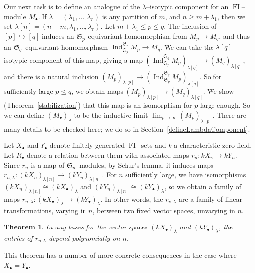 \documentclass[10pt]{amsart}
\DeclareMathOperator{\FI}{FI}
\DeclareMathOperator{\Ind}{Ind}
\newcommand{\Sn}{\mathfrak{S}}
\newcommand{\dt}{\bullet}
\newtheorem{thmab}[theorem]{Theorem}
\theoremstyle{definition}
\newcommand{\into}{\hookrightarrow}
\begin{document}
Our next task is to define an analogue of the $\lambda$--isotypic component for an $\FI$--module $M_{\dt}$. 
If $\lambda=(\lambda_1,\ldots,\lambda_r)$ is any partition of $m$, and $n \geq m + \lambda_1$, then we set $\lambda[n] = (n - m, \lambda_1,\ldots,\lambda_r)$.
Let $m+\lambda_1 \leq p \leq q$. The inclusion of $[p] \into [q]$ induces an $\Sn_{p}$--equivariant homomorphism from $M_{p} \to M_{q}$, and thus an $\Sn_{q}$--equivariant homomorphism $\Ind_{\Sn_p}^{\Sn_q} M_p \to M_q$. We can take the $\lambda[q]$ isotypic component of this map, giving a map $\left( \Ind_{\Sn_p}^{\Sn_q} M_p \right)_{\lambda[q]} \to \left( M_q \right)_{\lambda[q]}$, and there is a natural inclusion $\left( M_p \right)_{\lambda[p]} \to \left( \Ind_{\Sn_p}^{\Sn_q} M_p \right)_{\lambda[q]}$. So for sufficiently large $p \leq q$, we obtain maps $\left( M_p \right)_{\lambda[p]} \to \left( M_q \right)_{\lambda[q]}$. We show (Theorem~\ref{stabilization}) that this map is an isomorphism for $p$ large enough. So we can define $(M_{\dt})_{\lambda}$ to be the inductive limit $\lim_{p \to \infty} (M_p)_{\lambda[p]}$. There are many details to be checked here; we do so in Section~\ref{defineLambdaComponent}.

Let $X_\dt$ and $Y_\dt$ denote finitely generated $\FI$--sets and $k$ a characteristic zero field. 
Let $R_\dt$ denote a relation between them with associated maps $r_n:k X_n \rightarrow k Y_n$.
Since $r_n$ is a map of $\Sn_n$--modules, by Schur's lemma, it induces maps $r_{n, \lambda} : (k X_{n})_{\lambda[n]} \to (k Y_{n})_{\lambda[n]}$. 
For $n$ sufficiently large, we have isomorphisms $(k X_n)_{\lambda[n]} \cong (kX_{\dt})_{\lambda}$ and $(k Y_n)_{\lambda[n]} \cong (kY_{\dt})_{\lambda}$, so we obtain a family of maps 
$r_{n, \lambda}: (k X_{\dt})_{\lambda} \longrightarrow (k Y_{\dt})_{\lambda}$. In other words, the $r_{n,\lambda}$ are a family of linear transformations, varying in $n$, between two fixed vector spaces, unvarying in $n$.

\begin{thmab}\label{relationthm}
In any bases for the vector spaces $(k X_{\dt})_{\lambda}$ and $(k Y_{\dt})_{\lambda}$, the entries of $r_{n,\lambda}$ depend polynomially on $n$.
\end{thmab}

This theorem has a number of more concrete consequences in the case where $X_{\dt} = Y_{\dt}$.
 
\end{document}
